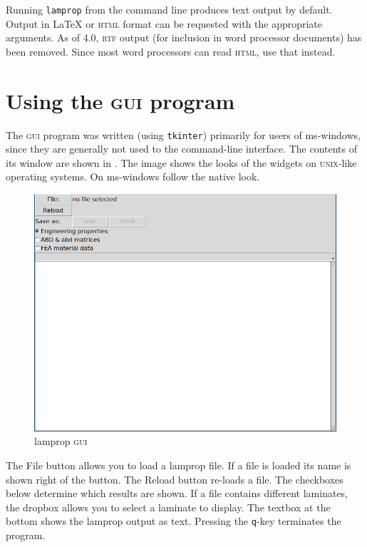 \documentclass[a4paper,landscape,oneside,11pt,twocolumn]{memoir}
\begin{document}
Running \texttt{lamprop} from the command line produces text output by
default. Output in \LaTeX{} or \textsc{html} format can be requested with the
appropriate arguments. As of 4.0, \textsc{rtf} output (for inclusion in word
processor documents) has been removed. Since most word processors can read
\textsc{html}, use that instead.


\section{Using the \textsc{gui} program} %

The \textsc{gui} program was written (using \texttt{tkinter}) primarily for
users of ms-windows, since they are generally not used to the command-line
interface. The contents of its window are shown in . The
image shows the looks of the widgets on \textsc{unix}-like operating systems.
On ms-windows follow the native look.

\begin{figure}[!htbp]
  \centerline{\includegraphics[scale=1]{lamprop-gui.png}}
  \caption{\label{fig:lamprop-gui}lamprop \textsc{gui}}
\end{figure}

The \textsf{File} button allows you to load a lamprop file. If a file is
loaded its name is shown right of the button. The \textsf{Reload} button
re-loads a file. The checkboxes below determine which results are shown. If
a file contains different laminates, the dropbox allows you to select
a laminate to display. The textbox at the bottom shows the lamprop output as
text.
Pressing the \texttt{q}-key terminates the program.
\end{document}
